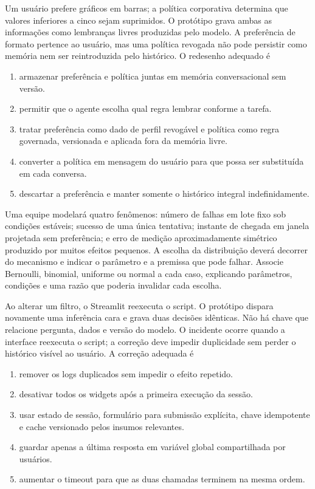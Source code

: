 \documentclass[12pt,a4paper]{article}
\begin{document}
\TextoBase
Um usuário prefere gráficos em barras; a política corporativa determina que valores inferiores a cinco sejam suprimidos. O protótipo grava ambas as informações como lembranças livres produzidas pelo modelo.
A preferência de formato pertence ao usuário, mas uma política revogada não pode persistir como memória nem ser reintroduzida pelo histórico.
\FonteDidatica
\Comando O redesenho adequado é
\begin{enumerate}[label=\Alph*)]
  \item armazenar preferência e política juntas em memória conversacional sem versão.
  \item permitir que o agente escolha qual regra lembrar conforme a tarefa.
  \item tratar preferência como dado de perfil revogável e política como regra governada, versionada e aplicada fora da memória livre.
  \item converter a política em mensagem do usuário para que possa ser substituída em cada conversa.
  \item descartar a preferência e manter somente o histórico integral indefinidamente.
\end{enumerate}

\TextoBase Uma equipe modelará quatro fenômenos: número de falhas em lote fixo sob condições estáveis; sucesso de uma única tentativa; instante de chegada em janela projetada sem preferência; e erro de medição aproximadamente simétrico produzido por muitos efeitos pequenos. A escolha da distribuição deverá decorrer do mecanismo e indicar o parâmetro e a premissa que pode falhar.
\FonteDidatica
\Comando Associe Bernoulli, binomial, uniforme ou normal a cada caso, explicando parâmetros, condições e uma razão que poderia invalidar cada escolha.
\EspacoDiscursiva

\TextoBase
Ao alterar um filtro, o Streamlit reexecuta o script. O protótipo dispara novamente uma inferência cara e grava duas decisões idênticas. Não há chave que relacione pergunta, dados e versão do modelo.
O incidente ocorre quando a interface reexecuta o script; a correção deve impedir duplicidade sem perder o histórico visível ao usuário.
\FonteDidatica
\Comando A correção adequada é
\begin{enumerate}[label=\Alph*)]
  \item remover os logs duplicados sem impedir o efeito repetido.
  \item desativar todos os widgets após a primeira execução da sessão.
  \item usar estado de sessão, formulário para submissão explícita, chave idempotente e cache versionado pelos insumos relevantes.
  \item guardar apenas a última resposta em variável global compartilhada por usuários.
  \item aumentar o timeout para que as duas chamadas terminem na mesma ordem.
\end{enumerate}
\end{document}
